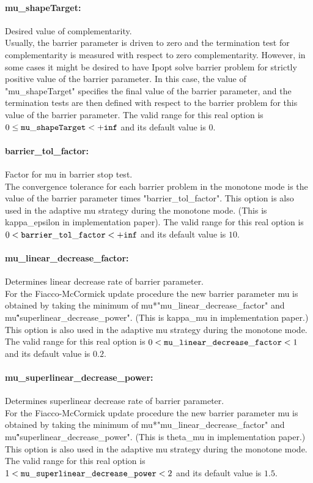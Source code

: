 \paragraph{mu\_shapeTarget:}\label{opt:mu_target} Desired value of complementarity. \\
 Usually, the barrier parameter is driven to zero and the termination test for complementarity is measured with respect to zero complementarity.  However, in some cases it might be desired to have Ipopt solve barrier problem for strictly positive value of the barrier parameter.  In this case, the value of "mu\_shapeTarget" specifies the final value of the barrier parameter, and the termination tests are then defined with respect to the barrier problem for this value of the barrier parameter. The valid range for this real option is
$0 \le {\tt mu\_shapeTarget } <  {\tt +inf}$
and its default value is $0$.


\paragraph{barrier\_tol\_factor:}\label{opt:barrier_tol_factor} Factor for mu in barrier stop test. \\
 The convergence tolerance for each barrier problem in the monotone mode is the value of the barrier parameter times "barrier\_tol\_factor". This option is also used in the adaptive mu strategy during the monotone mode. (This is kappa\_epsilon in implementation paper). The valid range for this real option is 
$0 <  {\tt barrier\_tol\_factor } <  {\tt +inf}$
and its default value is $10$.


\paragraph{mu\_linear\_decrease\_factor:}\label{opt:mu_linear_decrease_factor} Determines linear decrease rate of barrier parameter. \\
 For the Fiacco-McCormick update procedure the new barrier parameter mu is obtained by taking the minimum of mu*"mu\_linear\_decrease\_factor" and mu\^"superlinear\_decrease\_power".  (This is kappa\_mu in implementation paper.) This option is also used in the adaptive mu strategy during the monotone mode. The valid range for this real option is 
$0 <  {\tt mu\_linear\_decrease\_factor } <  1$
and its default value is $0.2$.


\paragraph{mu\_superlinear\_decrease\_power:}\label{opt:mu_superlinear_decrease_power} Determines superlinear decrease rate of barrier parameter. \\
 For the Fiacco-McCormick update procedure the new barrier parameter mu is obtained by taking the minimum of mu*"mu\_linear\_decrease\_factor" and mu\^"superlinear\_decrease\_power".  (This is theta\_mu in implementation paper.) This option is also used in the adaptive mu strategy during the monotone mode. The valid range for this real option is 
$1 <  {\tt mu\_superlinear\_decrease\_power } <  2$
and its default value is $1.5$.


